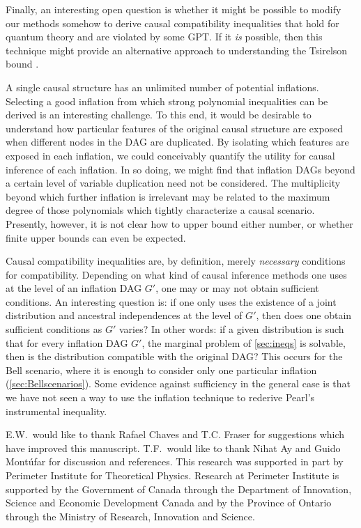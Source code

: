 \documentclass[aps,english,superscriptaddress,onecolumn,twoside,longbibliography,pra,floatfix,fleqn,nofootinbib]{revtex4-1}%
\theoremstyle{definition}
\begin{document}
Finally, an interesting open question is whether it might be possible to modify our methods somehow to derive causal compatibility inequalities that hold for quantum theory and are violated by some GPT.  If it {\em is} possible, then 
this technique might provide an alternative approach to understanding the Tsirelson bound \cite{Brunner2013Bell}.

A single causal structure has an unlimited number of potential inflations. Selecting a good inflation from which strong polynomial inequalities can be derived is an interesting challenge. To this end, it would be desirable to understand how particular features of the original causal structure are exposed when different nodes in the DAG are duplicated. By isolating which features are exposed in each inflation, we could conceivably quantify the utility for causal inference of each inflation. In so doing, we might find that inflation DAGs beyond a certain level of variable duplication need not be considered. The multiplicity beyond which further inflation is irrelevant may be related to the maximum degree of those polynomials which tightly characterize a causal scenario. Presently, however, it is not clear how to upper bound either number, or whether finite upper bounds can even be expected.


Causal compatibility inequalities are, by definition, merely {\em necessary} conditions for compatibility. Depending on what kind of causal inference methods one uses at the level of an inflation DAG $G'$, one may or may not obtain sufficient conditions. An interesting question is: if one only uses the existence of a joint distribution and ancestral independences at the level of $G'$, then does one obtain sufficient conditions as $G'$ varies? In other words: if a given distribution is such that for every inflation DAG $G'$, the marginal problem of \cref{sec:ineqs} is solvable, then is the distribution compatible with the original DAG? This occurs for the Bell scenario, where it is enough to consider only one particular inflation (\cref{sec:Bellscenarios}). Some evidence against sufficiency in the general case is that we have not seen a way to use the inflation technique to rederive Pearl's instrumental inequality.


\begin{acknowledgments}
E.W.~would like to thank Rafael Chaves and T.C. Fraser for suggestions which have improved this manuscript. T.F.~would like to thank Nihat Ay and Guido Mont\'ufar for discussion and references. This research was supported in part by Perimeter Institute for Theoretical Physics. Research at Perimeter Institute is supported by the Government of Canada through the Department of Innovation, Science and Economic Development Canada and by the Province of Ontario through the Ministry of Research, Innovation and Science.
\end{acknowledgments}
\end{document}
